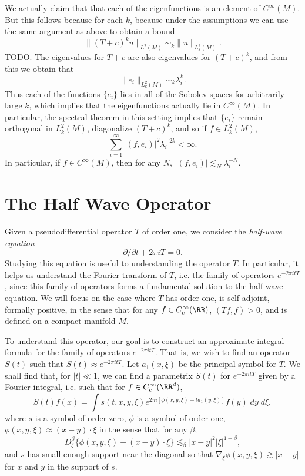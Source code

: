 We actually claim that that each of the eigenfunctions is an element of $C^\infty(M)$. But this follows because for each $k$, because under the assumptions we can use the same argument as above to obtain a bound
%
\[ \| (T + c)^k u \|_{L^2(M)} \sim_k \| u \|_{L^2_k(M)}. \]
%
TODO. The eigenvalues for $T + c$ are also eigenvalues for $(T + c)^k$, and from this we obtain that
%
\[ \| e_i \|_{L^2_k(M)} \sim_k \lambda_i^k. \]
%
Thus each of the functions $\{ e_i \}$ lies in all of the Sobolev spaces for arbitrarily large $k$, which implies that the eigenfunctions actually lie in $C^\infty(M)$. In particular, the spectral theorem in this setting implies that $\{ e_i \}$ remain orthogonal in $L^2_k(M)$, diagonalize $(T + c)^k$, and so if $f \in L^2_k(M)$,
%
\[ \sum_{i = 1}^\infty |(f,e_i)|^2 \lambda_i^{-2k} < \infty. \]
%
In particular, if $f \in C^\infty(M)$, then for any $N$, $|(f,e_i)| \lesssim_N \lambda_i^{-N}$.



\section{The Half Wave Operator}

Given a pseudodifferential operator $T$ of order one, we consider the \emph{half-wave equation}
%
\[ \partial / \partial t + 2 \pi i T = 0. \]
%
Studying this equation is useful to understanding the operator $T$. In particular, it helps us understand the Fourier transform of $T$, i.e. the family of operators $e^{-2 \pi i t T}$, since this family of operators forms a fundamental solution to the half-wave equation. We will focus on the case where $T$ has order one, is self-adjoint, formally positive, in the sense that for any $f \in C_c^\infty(\RR)$, $(Tf,f) > 0$, and is defined on a compact manifold $M$.

To understand this operator, our goal is to construct an approximate integral formula for the family of operators $e^{-2 \pi i t T}$. That is, we wish to find an operator $S(t)$ such that $S(t) \approx e^{-2 \pi i t T}$. Let $a_1(x,\xi)$ be the principal symbol for $T$. We shall find that, for $|t| \ll 1$, we can find a parametrix $S(t)$ for $e^{-2 \pi i t T}$ given by a Fourier integral, i.e. such that for $f \in C_c^\infty(\RR^d)$,
%
\[ S(t) f(x) = \int s(t,x,y,\xi) e^{2 \pi i[\phi(x,y,\xi) - ta_1(y,\xi)]} f(y)\; dy\; d\xi, \]
%
where $s$ is a symbol of order zero, $\phi$ is a symbol of order one, $\phi(x,y,\xi) \approx (x - y) \cdot \xi$ in the sense that for any $\beta$,
%
\[ D^\beta_\xi \{ \phi(x,y,\xi) - (x - y) \cdot \xi \} \lesssim_\beta |x - y|^2 |\xi|^{1 - \beta}, \]
%
and $s$ has small enough support near the diagonal so that $\nabla_\xi \phi(x,y,\xi) \gtrsim |x - y|$ for $x$ and $y$ in the support of $s$.

